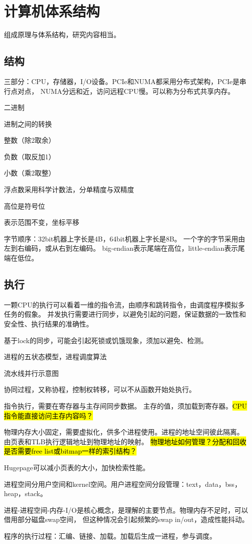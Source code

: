 \chapter{计算机体系结构}

组成原理与体系结构，研究内容相当。

\section{结构}

三部分：CPU，存储器，I/O设备。PCIe和NUMA都采用分布式架构，PCIe是串行点对点，
NUMA分远和近，访问远程CPU慢。可以称为分布式共享内存。

二进制

进制之间的转换
\begin{enumbox}
\item 整数（除2取余）
\item 负数（取反加1）
\item 小数（乘2取整）
\item 浮点数采用科学计数法，分单精度与双精度
\item 高位是符号位
\item 表示范围不变，坐标平移
\end{enumbox}

字节顺序：32bit机器上字长是4B，64bit机器上字长是8B。
一个字的字节采用由左到右编码，或从右到左编码。
big-endian表示尾端在高位，little-endian表示尾端在低位。

\section{执行}

一颗CPU的执行可以看着一维的指令流，由顺序和跳转指令，由调度程序模拟多任务的假象。
并发执行需要进行同步，以避免引起的问题，保证数据的一致性和安全性、执行结果的准确性。

基于lock的同步，可能会引起死锁或饥饿现象，须加以避免、检测。

进程的五状态模型，进程调度算法

流水线并行示意图

协同过程，又称协程，控制权转移，可以不从函数开始处执行。

指令执行，需要在寄存器与主存间同步数据。
主存的值，须加载到寄存器。\hl{CPU指令能直接访问主存内容吗？}

物理内存大小固定，需要虚拟化，供多个进程使用。进程的地址空间彼此隔离。
由页表和TLB执行逻辑地址到物理地址的映射。
\hl{物理地址如何管理？分配和回收是否需要free list或bitmap一样的索引结构？}

Hugepage可以减小页表的大小，加快检索性能。

进程空间分用户空间和kernel空间。用户进程空间分段管理：text，data，bss，heap，stack。

进程-进程空间-内存-I/O是核心概念，是理解的主要节点。物理内存不足时，可以借用部分磁盘swap空间，
但这种情况会引起频繁的swap in/out，造成性能抖动。

程序的执行过程：汇编、链接、加载。加载后生成一进程，参与调度。
